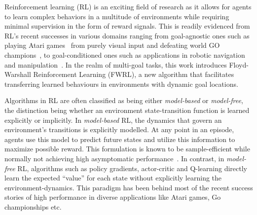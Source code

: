 Reinforcement learning (RL) is an exciting field of research as it
allows for agents to learn complex behaviors in a multitude of
environments while requiring minimal supervision in the form of reward
signals. This is readily evidenced from RL's recent successes in various
domains ranging from goal-agnostic ones such as  playing Atari
games~\cite{MnKaSiNATURE2015} from purely visual input and defeating
world GO champions~\cite{gibney2016google}, to goal-conditioned ones
such as applications in robotic
navigation~\cite{mirowski2018learning} and
manipulation~\cite{pong2018temporal}. In the realm of multi-goal tasks,
this work introduces Floyd-Warshall Reinforcement Learning (FWRL), a new
algorithm that facilitates transferring learned behaviours in
environments with dynamic goal locations.


Algorithms in RL are often classified as being either \emph{model-based}
or \emph{model-free}, the distinction being whether an environment
state-transition function is learned explicitly or implicitly.  In
\emph{model-based} RL, the dynamics that govern an environment's
transitions is explicitly modelled.  At any point in an episode, agents
use this model to predict future states and utilize this information to
maximize possible reward. This formulation is known to be
sample-efficient while normally not achieving high asymptomatic
performance~\cite{pong2018temporal}.  In contrast, in \emph{model-free}
RL, algorithms such as policy gradients, actor-critic and Q-learning
directly learn the expected ``value'' for each state without explicitly
learning the environment-dynamics. This paradigm has been behind most of
the recent success stories of high performance in diverse applications
like Atari games, Go championships etc.

